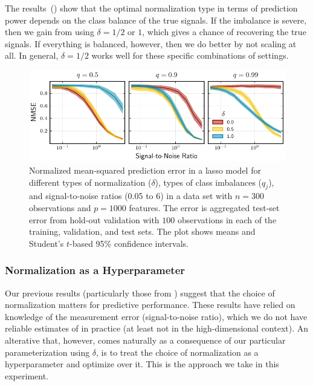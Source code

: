 The results~() show that the optimal normalization type in terms of
prediction power depends on the class balance of the true signals. If the imbalance is
severe, then we gain from using \(\delta=1/2\) or \(1\), which gives a chance of recovering
the true signals. If everything is balanced, however, then we do better by not scaling at
all. In general, \(\delta=1/2\) works well for these specific combinations of settings.

\begin{figure}[htpb]
  \centering
  \includegraphics[]{plots/binary_data_sim.pdf}
  \caption{%
    Normalized mean-squared prediction error in a lasso model for different types of
    normalization (\(\delta\)), types of class imbalances (\(q_j\)), and signal-to-noise ratios
    (0.05 to 6) in a data set with \(n=300\) observations and \(p = \num{1000}\) features. The
    error is aggregated test-set error from hold-out validation with \(100\) observations in
    each of the training, validation, and test sets. The plot shows means and Student's
    \(t\)-based 95\% confidence intervals. } \label{fig:binary-sim}
\end{figure}

\subsubsection{Normalization as a Hyperparameter}\label{sec:experiments-hyperparameter}


Our previous results (particularly those from ) suggest
that the choice of normalization matters for predictive performance. These results have
relied on knowledge of the measurement error (signal-to-noise ratio), which we do not have
reliable estimates of in practice (at least not in the high-dimensional context). An
alterative that, however, comes naturally as a consequence of our particular
parameterization using \(\delta\), is to treat the choice of normalization as a
hyperparameter and optimize over it. This is the approach we take in this experiment.

